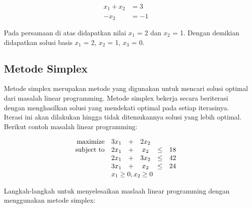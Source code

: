 \begin{equation*}
	\begin{split}
		x_1 + x_2 &= 3\\
		-x_2 &= -1
	\end{split}
\end{equation*}

Pada persamaan di atas didapatkan nilai \(x_1\) = 2 dan \(x_2\) = 1. Dengan demikian didapatkan solusi basis \(x_1\) = 2, \(x_2\) = 1, \(x_3\) = 0.

\subsection{Metode Simplex}
\label{metode_simplex}

Metode simplex merupakan metode yang digunakan untuk mencari solusi optimal dari masalah linear programming. Metode simplex bekerja secara beriterasi dengan menghasilkan solusi yang mendekati optimal pada setiap iterasinya. Iterasi ini akan dilakukan hingga tidak ditemukannya solusi yang lebih optimal. Berikut contoh masalah linear programming:

\begin{equation*}
	\begin{array}{r c c c c l}
		\text{maximize}   & 3x_1 & + & 2x_2 \\
		\text{subject to} & 2x_1 & + & x_2  & \leq & 18 \\
        					& 2x_1 & + & 3x_2 & \leq & 42 \\
                           	& 3x_1 & + & x_2  & \leq & 24 \\
                           	& \multicolumn{5}{l}{x_1\geq0,x_2\geq0} \\
	\end{array}
\end{equation*}
        
Langkah-langkah untuk menyelesaikan maslaah linear programming dengan menggunakan metode simplex:

